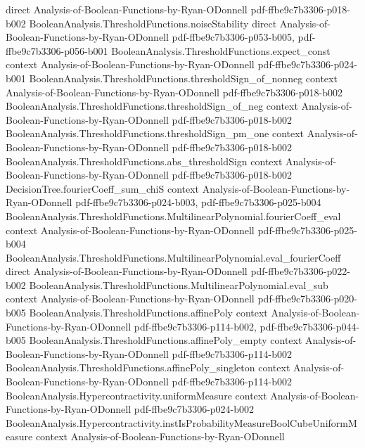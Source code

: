 \begin{lemma}
  {direct}
  {Analysis-of-Boolean-Functions-by-Ryan-ODonnell}
  {pdf-ffbe9c7b3306-p018-b002}
\proofstep
  {BooleanAnalysis.ThresholdFunctions.noiseStability}
  {direct}
  {Analysis-of-Boolean-Functions-by-Ryan-ODonnell}
  {pdf-ffbe9c7b3306-p053-b005,
    pdf-ffbe9c7b3306-p056-b001}
\proofstep
  {BooleanAnalysis.ThresholdFunctions.expect_const}
  {context}
  {Analysis-of-Boolean-Functions-by-Ryan-ODonnell}
  {pdf-ffbe9c7b3306-p024-b001}
\proofstep
  {BooleanAnalysis.ThresholdFunctions.thresholdSign_of_nonneg}
  {context}
  {Analysis-of-Boolean-Functions-by-Ryan-ODonnell}
  {pdf-ffbe9c7b3306-p018-b002}
\proofstep
  {BooleanAnalysis.ThresholdFunctions.thresholdSign_of_neg}
  {context}
  {Analysis-of-Boolean-Functions-by-Ryan-ODonnell}
  {pdf-ffbe9c7b3306-p018-b002}
\proofstep
  {BooleanAnalysis.ThresholdFunctions.thresholdSign_pm_one}
  {context}
  {Analysis-of-Boolean-Functions-by-Ryan-ODonnell}
  {pdf-ffbe9c7b3306-p018-b002}
\proofstep
  {BooleanAnalysis.ThresholdFunctions.abs_thresholdSign}
  {context}
  {Analysis-of-Boolean-Functions-by-Ryan-ODonnell}
  {pdf-ffbe9c7b3306-p018-b002}
\proofstep
  {DecisionTree.fourierCoeff_sum_chiS}
  {context}
  {Analysis-of-Boolean-Functions-by-Ryan-ODonnell}
  {pdf-ffbe9c7b3306-p024-b003,
    pdf-ffbe9c7b3306-p025-b004}
\proofstep
  {BooleanAnalysis.ThresholdFunctions.MultilinearPolynomial.fourierCoeff_eval}
  {context}
  {Analysis-of-Boolean-Functions-by-Ryan-ODonnell}
  {pdf-ffbe9c7b3306-p025-b004}
\proofstep
  {BooleanAnalysis.ThresholdFunctions.MultilinearPolynomial.eval_fourierCoeff}
  {direct}
  {Analysis-of-Boolean-Functions-by-Ryan-ODonnell}
  {pdf-ffbe9c7b3306-p022-b002}
\proofstep
  {BooleanAnalysis.ThresholdFunctions.MultilinearPolynomial.eval_sub}
  {context}
  {Analysis-of-Boolean-Functions-by-Ryan-ODonnell}
  {pdf-ffbe9c7b3306-p020-b005}
\proofstep
  {BooleanAnalysis.ThresholdFunctions.affinePoly}
  {context}
  {Analysis-of-Boolean-Functions-by-Ryan-ODonnell}
  {pdf-ffbe9c7b3306-p114-b002,
    pdf-ffbe9c7b3306-p044-b005}
\proofstep
  {BooleanAnalysis.ThresholdFunctions.affinePoly_empty}
  {context}
  {Analysis-of-Boolean-Functions-by-Ryan-ODonnell}
  {pdf-ffbe9c7b3306-p114-b002}
\proofstep
  {BooleanAnalysis.ThresholdFunctions.affinePoly_singleton}
  {context}
  {Analysis-of-Boolean-Functions-by-Ryan-ODonnell}
  {pdf-ffbe9c7b3306-p114-b002}
\proofstep
  {BooleanAnalysis.Hypercontractivity.uniformMeasure}
  {context}
  {Analysis-of-Boolean-Functions-by-Ryan-ODonnell}
  {pdf-ffbe9c7b3306-p024-b002}
\proofstep
  {BooleanAnalysis.Hypercontractivity.instIsProbabilityMeasureBoolCubeUniformMeasure}
  {context}
  {Analysis-of-Boolean-Functions-by-Ryan-ODonnell}

\end{lemma}
